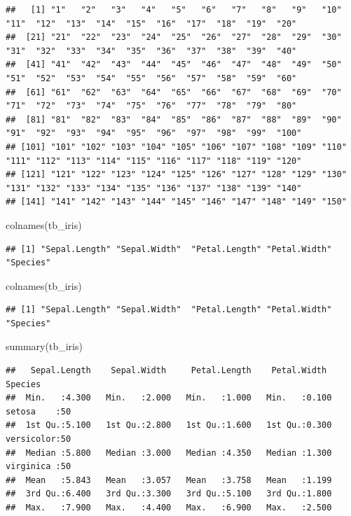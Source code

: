 \documentclass[
]{book}
\newenvironment{Shaded}{\begin{snugshade}}{\end{snugshade}}
\newcommand{\FunctionTok}[1]{\textcolor[rgb]{0.00,0.00,0.00}{#1}}
\newcommand{\NormalTok}[1]{#1}
\begin{document}
\begin{verbatim}
##   [1] "1"   "2"   "3"   "4"   "5"   "6"   "7"   "8"   "9"   "10"  "11"  "12"  "13"  "14"  "15"  "16"  "17"  "18"  "19"  "20" 
##  [21] "21"  "22"  "23"  "24"  "25"  "26"  "27"  "28"  "29"  "30"  "31"  "32"  "33"  "34"  "35"  "36"  "37"  "38"  "39"  "40" 
##  [41] "41"  "42"  "43"  "44"  "45"  "46"  "47"  "48"  "49"  "50"  "51"  "52"  "53"  "54"  "55"  "56"  "57"  "58"  "59"  "60" 
##  [61] "61"  "62"  "63"  "64"  "65"  "66"  "67"  "68"  "69"  "70"  "71"  "72"  "73"  "74"  "75"  "76"  "77"  "78"  "79"  "80" 
##  [81] "81"  "82"  "83"  "84"  "85"  "86"  "87"  "88"  "89"  "90"  "91"  "92"  "93"  "94"  "95"  "96"  "97"  "98"  "99"  "100"
## [101] "101" "102" "103" "104" "105" "106" "107" "108" "109" "110" "111" "112" "113" "114" "115" "116" "117" "118" "119" "120"
## [121] "121" "122" "123" "124" "125" "126" "127" "128" "129" "130" "131" "132" "133" "134" "135" "136" "137" "138" "139" "140"
## [141] "141" "142" "143" "144" "145" "146" "147" "148" "149" "150"
\end{verbatim}

\begin{Shaded}
\begin{Highlighting}[]
\FunctionTok{colnames}\NormalTok{(tb\_iris)}
\end{Highlighting}
\end{Shaded}

\begin{verbatim}
## [1] "Sepal.Length" "Sepal.Width"  "Petal.Length" "Petal.Width"  "Species"
\end{verbatim}

\begin{Shaded}
\begin{Highlighting}[]
\FunctionTok{colnames}\NormalTok{(tb\_iris)}
\end{Highlighting}
\end{Shaded}

\begin{verbatim}
## [1] "Sepal.Length" "Sepal.Width"  "Petal.Length" "Petal.Width"  "Species"
\end{verbatim}

\begin{Shaded}
\begin{Highlighting}[]
\FunctionTok{summary}\NormalTok{(tb\_iris)}
\end{Highlighting}
\end{Shaded}

\begin{verbatim}
##   Sepal.Length    Sepal.Width     Petal.Length    Petal.Width          Species  
##  Min.   :4.300   Min.   :2.000   Min.   :1.000   Min.   :0.100   setosa    :50  
##  1st Qu.:5.100   1st Qu.:2.800   1st Qu.:1.600   1st Qu.:0.300   versicolor:50  
##  Median :5.800   Median :3.000   Median :4.350   Median :1.300   virginica :50  
##  Mean   :5.843   Mean   :3.057   Mean   :3.758   Mean   :1.199                  
##  3rd Qu.:6.400   3rd Qu.:3.300   3rd Qu.:5.100   3rd Qu.:1.800                  
##  Max.   :7.900   Max.   :4.400   Max.   :6.900   Max.   :2.500
\end{verbatim}
\end{document}
